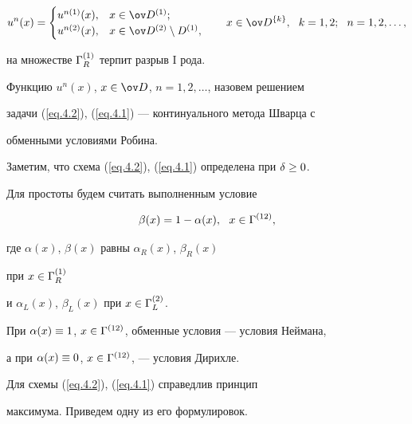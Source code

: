 \begin{subequations}
\begin{equation} \label{eq.4.2b}


u^n(x)=\begin{cases}


u^{n(1)}(x), & x \in \od^{(1)}; \\


u^{n(2)}(x), & x \in \od^{(2)} \setminus D^{(1)},


\end{cases}


\qquad x \in \od^{\{k\}}, \ \ k=1,2;\ \ n=1,2,\dotsc,


\end{equation}


\end{subequations}


на множестве $\Gamma^{(1)}_R$ терпит разрыв I рода.


Функцию $u^n(x)$, $x \in \od$, $n=1,2,\dotsc$, назовем решением


задачи (\ref{eq.4.2}), (\ref{eq.4.1}) --- континуального метода Шварца с


обменными условиями Робина.


Заметим, что схема (\ref{eq.4.2}), (\ref{eq.4.1}) определена при $\delta\geq 0$.





Для простоты будем считать выполненным условие


\begin{equation} \label{eq.4.3}


\beta(x)=1-\alpha(x), \ \ x\in \G^{(12)},


\end{equation}


где $\alpha(x)$, $\beta(x)$ равны $\alpha_R(x)$, $\beta_R(x)$


при $x\in \Gamma^{(1)}_R$


и $\alpha_L(x)$, $\beta_L(x)$ при $x\in\Gamma^{(2)}_L$.


При $\alpha(x)\equiv 1$, $x\in \Gamma^{(12)}$, обменные условия --- условия Неймана,


а при $\alpha(x)\equiv 0$, $x\in \Gamma^{(12)}$, --- условия Дирихле.





Для схемы (\ref{eq.4.2}), (\ref{eq.4.1}) справедлив принцип


максимума. Приведем одну из его формулировок.









